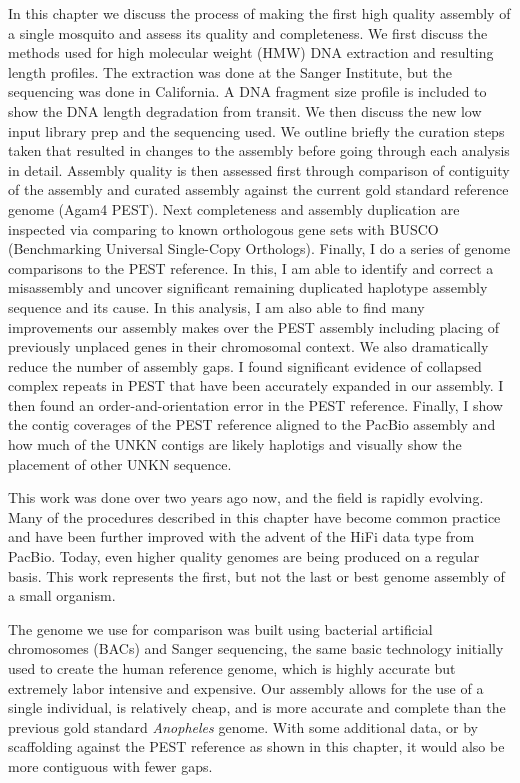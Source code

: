 \par{
In this chapter we discuss the process of making the first high quality assembly of a single mosquito and assess its quality and completeness. We first discuss the methods used for high molecular weight (HMW) DNA extraction and resulting length profiles. The extraction was done at the Sanger Institute, but the sequencing was done in California. A DNA fragment size profile is included to show the DNA length degradation from transit. We then discuss the new low input library prep and the sequencing used. We outline briefly the curation steps taken that resulted in changes to the assembly before going through each analysis in detail. Assembly quality is then assessed first through comparison of contiguity of the assembly and curated assembly against the current gold standard reference genome (Agam4 PEST). Next completeness and assembly duplication are inspected via comparing to known orthologous gene sets with BUSCO (Benchmarking Universal Single-Copy Orthologs). Finally, I do a series of genome comparisons to the PEST reference. In this, I am able to identify and correct a misassembly and uncover significant remaining duplicated haplotype assembly sequence and its cause. In this analysis, I am also able to find many improvements our assembly makes over the PEST assembly including placing of previously unplaced genes in their chromosomal context. We also dramatically reduce the number of assembly gaps. I found significant evidence of collapsed complex repeats in PEST that have been accurately expanded in our assembly. I then found an order-and-orientation error in the PEST reference. Finally, I show the contig coverages of the PEST reference aligned to the PacBio assembly and how much of the UNKN contigs are likely haplotigs and visually show the placement of other UNKN sequence.
} 

\par{
This work was done over two years ago now, and the field is rapidly evolving. Many of the procedures described in this chapter have become common practice and have been further improved with the advent of the HiFi data type from PacBio. Today, even higher quality genomes are being produced on a regular basis. This work represents the first, but not the last or best genome assembly of a small organism.
}

\par{
The genome we use for comparison was built using bacterial artificial chromosomes (BACs) and Sanger sequencing, the same basic technology initially used to create the human reference genome, which is highly accurate but extremely labor intensive and expensive. Our assembly allows for the use of a single individual, is relatively cheap, and is more accurate and complete than the previous gold standard \textit{Anopheles} genome. With some additional data, or by scaffolding against the PEST reference as shown in this chapter, it would also be more contiguous with fewer gaps.
}

